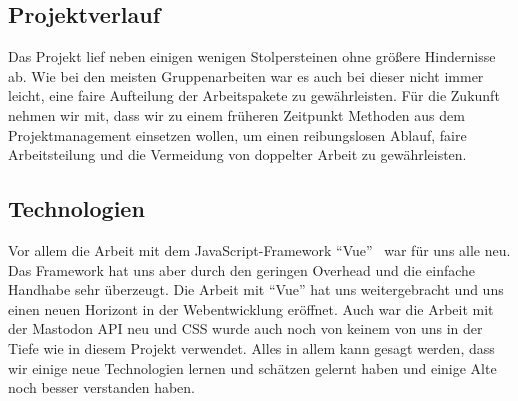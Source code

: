 \documentclass[fleqn,10pt]{SelfArx} %
\begin{document}
\subsection{Projektverlauf}
Das Projekt lief neben einigen wenigen Stolpersteinen ohne größere Hindernisse ab. Wie bei den meisten Gruppenarbeiten war es auch bei dieser nicht immer leicht, eine faire Aufteilung der Arbeitspakete zu gewährleisten. Für die Zukunft nehmen wir mit, dass wir zu einem früheren Zeitpunkt Methoden aus dem Projektmanagement einsetzen wollen, um einen reibungslosen Ablauf, faire Arbeitsteilung und die Vermeidung von doppelter Arbeit zu gewährleisten.
\subsection{Technologien}
Vor allem die Arbeit mit dem JavaScript-Framework \enquote{Vue}~\cite{vue} war für uns alle neu. Das Framework hat uns aber durch den geringen Overhead und die einfache Handhabe sehr überzeugt. Die Arbeit mit \enquote{Vue} hat uns weitergebracht und uns einen neuen Horizont in der Webentwicklung eröffnet. 
Auch war die Arbeit mit der Mastodon API neu und CSS wurde auch noch von keinem von uns in der Tiefe wie in diesem Projekt verwendet. Alles in allem kann gesagt werden, dass wir einige neue Technologien lernen und schätzen gelernt haben und einige Alte noch besser verstanden haben.
\end{document}

